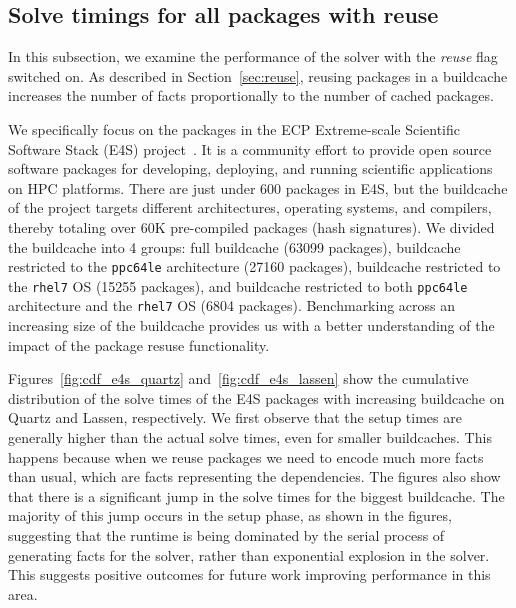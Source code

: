 
\subsection{Solve timings for all packages with reuse}

In this subsection, we examine the performance of the solver with the \emph{reuse} flag switched on. As described in Section~\ref{sec:reuse}, reusing packages in a buildcache increases the number of facts proportionally to the number of cached packages.





We specifically focus on the packages in the ECP Extreme-scale Scientific Software Stack (E4S) project~\cite{e4s}. It is a community effort to provide open source software packages for developing, deploying, and running scientific applications on HPC platforms. There are just under 600 packages in E4S, but the buildcache of the project targets different architectures, operating systems, and compilers, thereby totaling over 60K pre-compiled packages (hash signatures). We divided the buildcache into 4 groups: full buildcache (63099 packages), buildcache restricted to the \texttt{ppc64le} architecture (27160 packages), buildcache restricted to the \texttt{rhel7} OS (15255 packages), and buildcache restricted to both \texttt{ppc64le} architecture and the \texttt{rhel7} OS (6804 packages). Benchmarking across an increasing size of the buildcache provides us with a better understanding of the impact of the package resuse functionality.

Figures~\ref{fig:cdf_e4s_quartz} and~\ref{fig:cdf_e4s_lassen} show the cumulative distribution of the solve times of the E4S packages with increasing buildcache on Quartz and Lassen, respectively. We first observe that the setup times are generally higher than the actual solve times, even for smaller buildcaches. This happens because when we reuse packages we need to encode much more facts than usual, which are facts representing the dependencies. The figures also show that there is a significant jump in the solve times for the biggest buildcache. The majority of this jump occurs in the setup phase, as shown in the figures, suggesting that the runtime is being dominated by the serial process of generating facts for the solver, rather than exponential explosion in the solver. This suggests positive outcomes for future work improving performance in this area.
